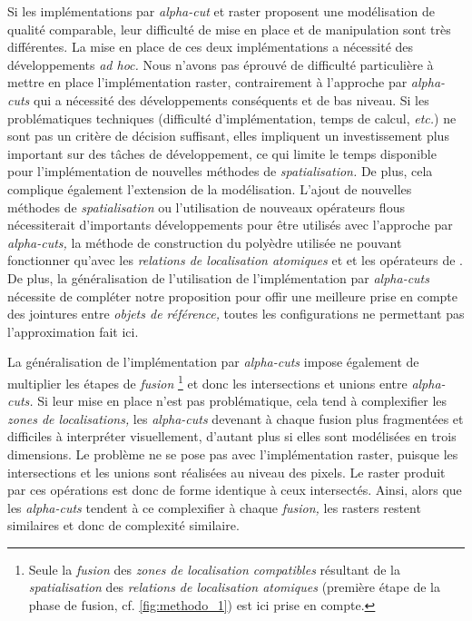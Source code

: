 
Si les implémentations par \emph{alpha-cut} et raster proposent une
modélisation de qualité comparable, leur difficulté de mise en place
et de manipulation sont très différentes. La mise en place de ces deux
implémentations a nécessité des développements \emph{ad hoc.} Nous
n'avons pas éprouvé de difficulté particulière à mettre en place
l'implémentation raster, contrairement à l'approche par
\emph{alpha-cuts} qui a nécessité des développements conséquents et de
bas niveau. Si les problématiques techniques (\eg difficulté
d'implémentation, temps de calcul, \emph{etc.}) ne sont pas un critère
de décision suffisant, elles impliquent un investissement plus
important sur des tâches de développement, ce qui limite le temps
disponible pour l'implémentation de nouvelles méthodes de
\emph{spatialisation.} De plus, cela complique également l'extension
de la modélisation. L'ajout de nouvelles méthodes de
\emph{spatialisation} ou l'utilisation de nouveaux opérateurs flous
nécessiterait d'importants développements pour être utilisés avec
l'approche par \emph{alpha-cuts,} la méthode de construction du
polyèdre utilisée ne pouvant fonctionner qu'avec les \emph{relations
  de localisation atomiques}
 et
et les opérateurs de \textcite{Zadeh1965}. De plus, la généralisation
de l'utilisation de l'implémentation par \emph{alpha-cuts} nécessite
de compléter notre proposition pour offir une meilleure prise en
compte des jointures entre \emph{objets de référence,} toutes les
configurations ne permettant pas l'approximation fait ici.

La généralisation de l'implémentation par \emph{alpha-cuts} impose
également de multiplier les étapes de \emph{fusion} \footnote{Seule la
  \emph{fusion} des \emph{zones de localisation compatibles} résultant
  de la \emph{spatialisation} des \emph{relations de localisation
    atomiques} (première étape de la phase de fusion,
  cf. \autoref{fig:methodo_1}) est ici prise en compte.} et donc les
intersections et unions entre \emph{alpha-cuts.} Si leur mise en place
n'est pas problématique, cela tend à complexifier les \emph{zones de
  localisations,} les \emph{alpha-cuts} devenant à chaque fusion plus
fragmentées et difficiles à interpréter visuellement, d'autant plus si
elles sont modélisées en trois dimensions. Le problème ne se pose pas
avec l'implémentation raster, puisque les intersections et les unions
sont réalisées au niveau des pixels. Le raster produit par ces
opérations est donc de forme identique à ceux intersectés. Ainsi,
alors que les \emph{alpha-cuts} tendent à ce complexifier à chaque
\emph{fusion,} les rasters restent similaires et donc de complexité
similaire.


